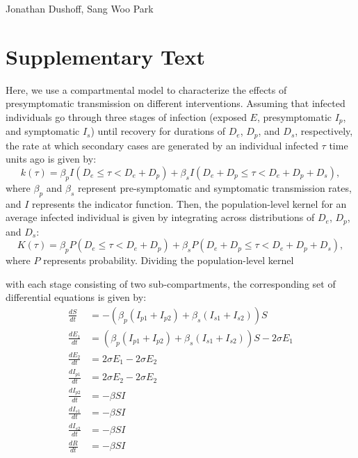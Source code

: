 \documentclass[12pt]{article}
\date{\today}
\begin{document}
\begin{flushleft}
	{\Large \textbf{}}
	\newline
	Jonathan Dushoff,
	Sang Woo Park
\end{flushleft}

\section{Supplementary Text}

Here, we use a compartmental model to characterize the effects of presymptomatic transmission on different interventions.
Assuming that infected individuals go through three stages of infection (exposed $E$, presymptomatic $I_p$, and symptomatic $I_s$) until recovery for durations of $D_e$, $D_p$, and $D_s$, respectively, the rate at which secondary cases are generated by an individual infected $\tau$ time units ago is given by:
\begin{equation}
k(\tau) = \beta_p I(D_e \leq \tau < D_e + D_p) + \beta_s I(D_e + D_p \leq \tau < D_e + D_p + D_s),
\end{equation}
where $\beta_p$ and $\beta_s$ represent pre-symptomatic and symptomatic transmission rates, and $I$ represents the indicator function.
Then, the population-level kernel for an average infected individual is given by integrating across distributions of $D_e$, $D_p$, and $D_s$:
\begin{equation}
K(\tau) = \beta_p P(D_e \leq \tau < D_e + D_p) + \beta_s P(D_e + D_p \leq \tau < D_e + D_p + D_s),
\end{equation}
where $P$ represents probability.
Dividing the population-level kernel 
 
with each stage consisting of two sub-compartments, the corresponding set of differential equations is given by:
\begin{equation}
\begin{aligned}
\frac{dS}{dt} &= - \left(\beta_p (I_{p1} + I_{p2}) + \beta_s (I_{s1} + I_{s2})\right) S \\
\frac{dE_1}{dt} &=   \left(\beta_p (I_{p1} + I_{p2}) + \beta_s (I_{s1} + I_{s2})\right) S - 2 \sigma E_1 \\
\frac{dE_2}{dt} &= 2 \sigma E_1 - 2 \sigma E_2\\
\frac{dI_{p1}}{dt} &= 2 \sigma E_2 - 2 \sigma E_2\\
\frac{dI_{p2}}{dt} &= - \beta S I\\
\frac{dI_{s1}}{dt} &= - \beta S I\\
\frac{dI_{s2}}{dt} &= - \beta S I\\
\frac{dR}{dt} &= - \beta S I\\
\end{aligned}
\end{equation}
\end{document}
